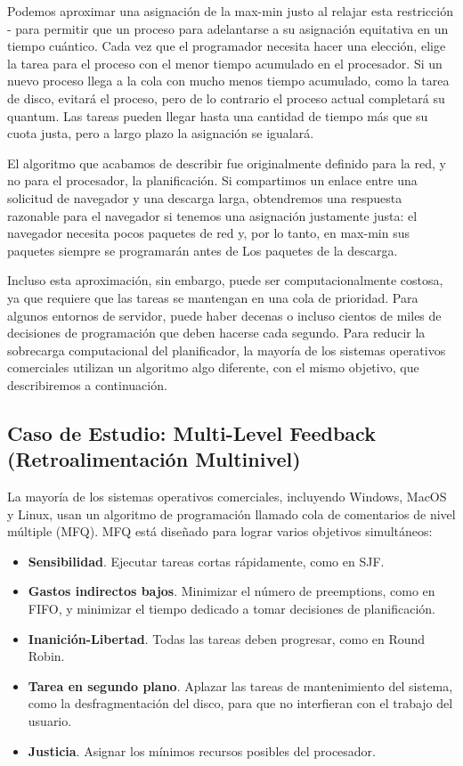 \documentclass[10pt]{book}
\begin{document}
Podemos aproximar una asignación de la max-min justo al relajar esta restricción - para permitir que un proceso para adelantarse a su asignación equitativa en un tiempo cuántico. Cada vez que el programador necesita hacer una elección, elige la tarea para el proceso con el menor tiempo acumulado en el procesador. Si un nuevo proceso llega a la cola con mucho menos tiempo acumulado, como la tarea de disco, evitará el proceso, pero de lo contrario el proceso actual completará su quantum. Las tareas pueden llegar hasta una cantidad de tiempo más que su cuota justa, pero a largo plazo la asignación se igualará.

El algoritmo que acabamos de describir fue originalmente definido para la red, y no para el procesador, la planificación. Si compartimos un enlace entre una solicitud de navegador y una descarga larga, obtendremos una respuesta razonable para el navegador si tenemos una asignación justamente justa: el navegador necesita pocos paquetes de red y, por lo tanto, en max-min sus paquetes siempre se programarán antes de Los paquetes de la descarga.

Incluso esta aproximación, sin embargo, puede ser computacionalmente costosa, ya que requiere que las tareas se mantengan en una cola de prioridad. Para algunos entornos de servidor, puede haber decenas o incluso cientos de miles de decisiones de programación que deben hacerse cada segundo. Para reducir la sobrecarga computacional del planificador, la mayoría de los sistemas operativos comerciales utilizan un algoritmo algo diferente, con el mismo objetivo, que describiremos a continuación.

\subsection{Caso de Estudio: Multi-Level Feedback (Retroalimentación Multinivel)}
La mayoría de los sistemas operativos comerciales, incluyendo Windows, MacOS y Linux, usan un algoritmo de programación llamado cola de comentarios de nivel múltiple (MFQ). MFQ está diseñado para lograr varios objetivos simultáneos:
\begin{itemize}
\item \textbf{Sensibilidad}. Ejecutar tareas cortas rápidamente, como en SJF.
\item \textbf{Gastos indirectos bajos}. Minimizar el número de preemptions, como en FIFO, y minimizar el tiempo dedicado a tomar decisiones de planificación.
\item \textbf{Inanición-Libertad}. Todas las tareas deben progresar, como en Round Robin.
\item \textbf{Tarea en segundo plano}. Aplazar las tareas de mantenimiento del sistema, como la desfragmentación del disco, para que no interfieran con el trabajo del usuario.
\item \textbf{Justicia}. Asignar los mínimos recursos posibles del procesador.
\end{itemize}
\end{document}
